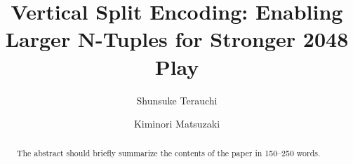 \documentclass[runningheads,dvipdfmx]{llncs}
\begin{document}
%
\title{Vertical Split Encoding: Enabling Larger N-Tuples for Stronger 2048 Play}
%
%
\author{Shunsuke Terauchi \and %
Kiminori Matsuzaki}
%
%
%
\maketitle              %
%
\begin{abstract}
The abstract should briefly summarize the contents of the paper in
150--250 words.

\end{abstract}
%
%
%








\end{document}
